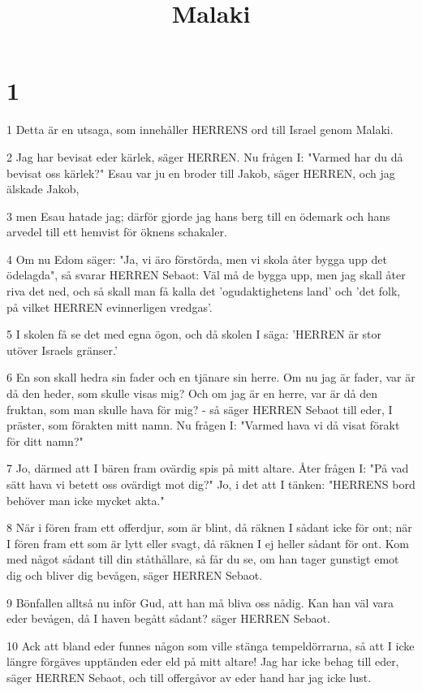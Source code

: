 

\title{Malaki}


\chapter{1}

\par 1 Detta är en utsaga, som innehåller HERRENS ord till Israel genom Malaki.
\par 2 Jag har bevisat eder kärlek, säger HERREN. Nu frågen I: "Varmed har du då bevisat oss kärlek?" Esau var ju en broder till Jakob, säger HERREN, och jag älskade Jakob,
\par 3 men Esau hatade jag; därför gjorde jag hans berg till en ödemark och hans arvedel till ett hemvist för öknens schakaler.
\par 4 Om nu Edom säger: "Ja, vi äro förstörda, men vi skola åter bygga upp det ödelagda", så svarar HERREN Sebaot: Väl må de bygga upp, men jag skall åter riva det ned, och så skall man få kalla det 'ogudaktighetens land' och 'det folk, på vilket HERREN evinnerligen vredgas'.
\par 5 I skolen få se det med egna ögon, och då skolen I säga: 'HERREN är stor utöver Israels gränser.'
\par 6 En son skall hedra sin fader och en tjänare sin herre. Om nu jag är fader, var är då den heder, som skulle visas mig? Och om jag är en herre, var är då den fruktan, som man skulle hava för mig? - så säger HERREN Sebaot till eder, I präster, som förakten mitt namn. Nu frågen I: "Varmed hava vi då visat förakt för ditt namn?"
\par 7 Jo, därmed att I bären fram ovärdig spis på mitt altare. Åter frågen I: "På vad sätt hava vi betett oss ovärdigt mot dig?" Jo, i det att I tänken: "HERRENS bord behöver man icke mycket akta."
\par 8 När i fören fram ett offerdjur, som är blint, då räknen I sådant icke för ont; när I fören fram ett som är lytt eller svagt, då räknen I ej heller sådant för ont. Kom med något sådant till din ståthållare, så får du se, om han tager gunstigt emot dig och bliver dig bevågen, säger HERREN Sebaot.
\par 9 Bönfallen alltså nu inför Gud, att han må bliva oss nådig. Kan han väl vara eder bevågen, då I haven begått sådant? säger HERREN Sebaot.
\par 10 Ack att bland eder funnes någon som ville stänga tempeldörrarna, så att I icke längre förgäves upptänden eder eld på mitt altare! Jag har icke behag till eder, säger HERREN Sebaot, och till offergåvor av eder hand har jag icke lust.
